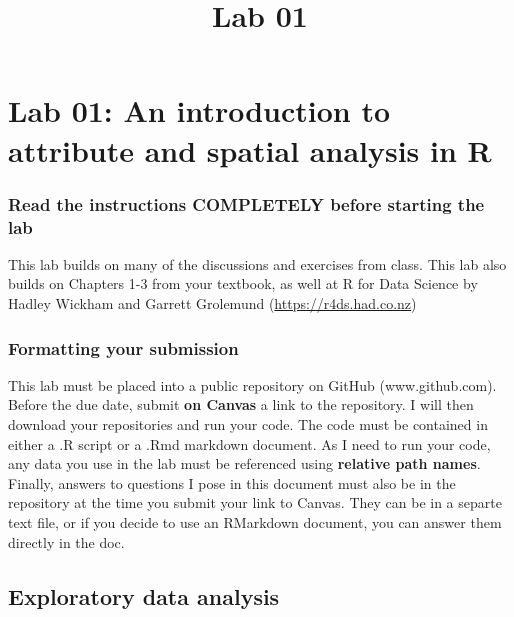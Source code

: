 \documentclass[]{article}
\title{Lab 01}
\author{}
\date{}
\makeatletter
\renewcommand{\maketitle}{\bgroup\vspace*{-1cm}\setlength{\parindent}{0pt}
\begin{flushleft}
  \@author
  
  \@date
  
\end{flushleft}\egroup
}
\makeatother
\begin{document}
\maketitle

\hypertarget{lab-01-an-introduction-to-attribute-and-spatial-analysis-in-r}{%
\section{Lab 01: An introduction to attribute and spatial analysis in
R}\label{lab-01-an-introduction-to-attribute-and-spatial-analysis-in-r}}

\hypertarget{read-the-instructions-completely-before-starting-the-lab}{%
\subsubsection{Read the instructions COMPLETELY before starting the
lab}\label{read-the-instructions-completely-before-starting-the-lab}}

This lab builds on many of the discussions and exercises from class.
This lab also builds on Chapters 1-3 from your textbook, as well at R
for Data Science by Hadley Wickham and Garrett Grolemund
(\url{https://r4ds.had.co.nz})

\hypertarget{formatting-your-submission}{%
\subsubsection{Formatting your
submission}\label{formatting-your-submission}}

This lab must be placed into a public repository on GitHub
(www.github.com). Before the due date, submit \textbf{on Canvas} a link
to the repository. I will then download your repositories and run your
code. The code must be contained in either a .R script or a .Rmd
markdown document. As I need to run your code, any data you use in the
lab must be referenced using \textbf{relative path names}. Finally,
answers to questions I pose in this document must also be in the
repository at the time you submit your link to Canvas. They can be in a
separte text file, or if you decide to use an RMarkdown document, you
can answer them directly in the doc.

\hypertarget{exploratory-data-analysis}{%
\subsection{Exploratory data analysis}\label{exploratory-data-analysis}}
\end{document}
